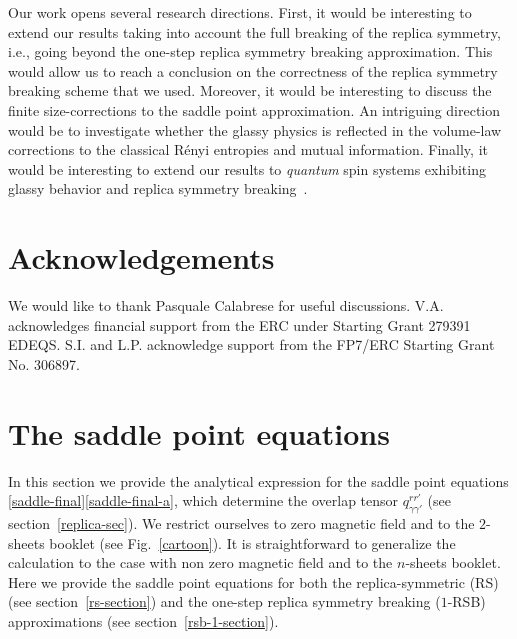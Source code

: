 \documentclass[twocolumn,superscriptaddress,prb,10pt]{revtex4-1}
\begin{document}
Our work opens several research directions. First, it would be interesting to extend our 
results taking into account the full breaking of the replica symmetry, i.e., going beyond 
the one-step replica symmetry breaking approximation. This would allow us to reach a 
conclusion on the correctness of the replica symmetry breaking scheme that we used. Moreover, 
it would be interesting to discuss the finite size-corrections to the saddle point 
approximation. An intriguing direction would be to investigate whether the glassy 
physics is reflected in the volume-law corrections to the classical R\'enyi entropies 
and mutual information. Finally, it would be interesting to extend our results to {\it quantum} 
spin systems exhibiting glassy behavior and replica symmetry breaking~\cite{read-1995,
andreanov-2012}. 



\section{Acknowledgements}
We would like to thank Pasquale Calabrese for useful discussions. V.A.  acknowledges  
financial support from the ERC under Starting Grant 279391 EDEQS. S.I. and L.P. 
acknowledge support  from the  FP7/ERC Starting Grant No. 306897. 



\appendix

\section{The saddle point equations} 
\label{saddle-equations}

In this section we provide the analytical expression for the saddle point equations 
\eqref{saddle-final}\eqref{saddle-final-a}, which determine the overlap tensor 
$q_{\gamma\gamma'}^{rr'}$ (see section~\ref{replica-sec}). We restrict ourselves 
to zero magnetic field and to the $2$-sheets booklet (see Fig.~\ref{cartoon}). It is 
straightforward to generalize the calculation to the case with non zero magnetic 
field and to the $n$-sheets booklet. Here we provide the saddle point equations 
for both the replica-symmetric (RS) (see section~\ref{rs-section}) and the one-step 
replica symmetry breaking ($1$-RSB) approximations (see section~\ref{rsb-1-section}). 
\end{document}
